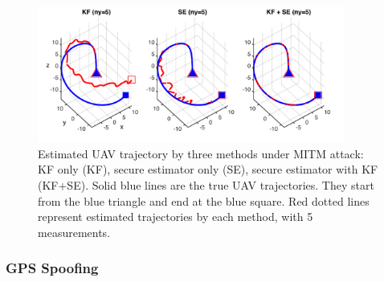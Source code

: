 \documentclass[../../thesis.tex]{subfiles}
\begin{document}
\begin{figure}
\center
\includegraphics[width=0.9\textwidth]{chapters/se_linear/figures/qh/uav_lq_traj}
\caption{Estimated UAV trajectory by three methods under MITM attack: KF only (KF), secure estimator only (SE), secure estimator with KF (KF+SE). Solid blue lines are the true UAV trajectories. They start from the blue triangle and end at the blue square. Red dotted lines represent estimated trajectories by each method, with 5 measurements.}
\label{fig:ex_uav_remote}
\end{figure}

\subsubsection{GPS Spoofing}
\end{document}
